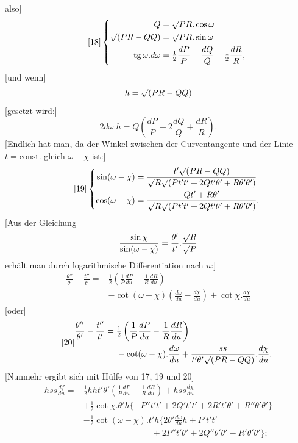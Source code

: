 %
\noindent also]
\begin{equation}\tag*{[18]}
\left\{\begin{aligned}
Q&=\mathord{\surd}PR.\cos\omega\\
\mathord{\surd}(PR-QQ)&=\mathord{\surd}PR.\sin\omega\\
\operatorname{tg}\omega.d\omega&=\tfrac12\frac{dP}{P}-\frac{dQ}{Q}+\tfrac12\frac{dR}{R},
\end{aligned}\right.
\end{equation}
[und wenn]
\[
h=\mathord{\surd}(PR-QQ)
\]
[gesetzt wird:]
\begin{equation}\tag*{[$18'$]}
2d\omega.h=Q\left(\frac{dP}{P}-2\frac{dQ}{Q}+\frac{dR}{R}\right).
\end{equation}
[Endlich hat man, da der Winkel zwischen der Curventangente und der Linie $t=\text{const.}$ gleich $\omega-\chi$ ist:]
\begin{equation}\tag*{[19]}
\left\{\begin{aligned}
\sin(\omega-\chi)&=\frac{t'\mathord{\surd}(PR-QQ)}{\mathord{\surd}R\mathord{\surd}(Pt't'+2Qt'\theta'+R\theta'\theta')}\\
\cos(\omega-\chi)&=\frac{Qt'+R\theta'}{\mathord{\surd}R\mathord{\surd}(Pt't'+2Qt'\theta'+R\theta'\theta')}.
\end{aligned}\right.
\end{equation}
[Aus der Gleichung
\[
\frac{\sin\chi}{\sin(\omega-\chi)}=\frac{\theta'}{t'}.\frac{\mathord{\surd}R}{\mathord{\surd}P}
\]
erhält man durch logarithmische Differentiation nach $u$:]
\[
\begin{aligned}
\frac{\theta''}{\theta'}-\frac{t''}{t'}={}&\tfrac12\left(\frac1P\frac{dP}{du}-\frac1R\frac{dR}{du}\right)\\
&-\cot(\omega-\chi)\left(\frac{d\omega}{du}-\frac{d\chi}{du}\right)+\cot\chi.\frac{d\chi}{du}
\end{aligned}
\]
[oder]
\begin{equation}\tag*{[20]}
\begin{aligned}
\frac{\theta''}{\theta'}-\frac{t''}{t'}={}&\tfrac12\left(\frac1P\frac{dP}{du}-\frac1R\frac{dR}{du}\right)\\
&-\cot(\omega-\chi).\frac{d\omega}{du}+\frac{ss}{t'\theta'\mathord{\surd}(PR-QQ)}.\frac{d\chi}{du}.
\end{aligned}
\end{equation}
[Nunmehr ergibt sich mit Hülfe von 17, 19 und 20]
\[
\begin{aligned}
hss\frac{df}{du}={}&\tfrac12hht'\theta'\left(\frac1P\frac{dP}{du}-\frac1R\frac{dR}{du}\right)+hss\frac{d\chi}{du}\\
&+\tfrac12\cot\chi.\theta'h\{-P''t't'+2Q't't'+2R't'\theta'+R''\theta'\theta'\}\\
&-\tfrac12\cot(\omega-\chi).t'h\{2\theta'\frac{d\omega}{du}h+P't't'\\
&\hspace{8em}+2P''t'\theta'+2Q''\theta'\theta'-R'\theta'\theta'\};
\end{aligned}
\]
